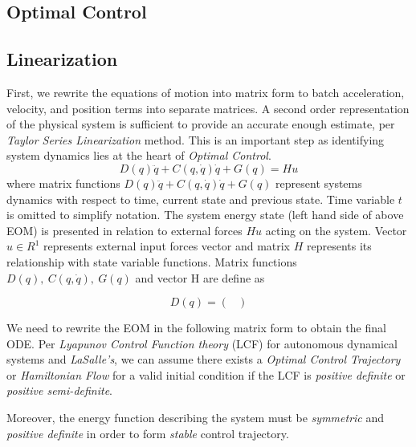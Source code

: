 \documentclass[journal]{IEEEtran}
\begin{document}
\subsection{Optimal Control}

\subsection{Linearization}
First, we rewrite the equations of motion into matrix form to batch acceleration,
velocity, and position terms into separate matrices. A second order representation
of the physical system is sufficient to provide an accurate enough estimate,
per \emph{Taylor Series Linearization} method. This is an important step as
identifying system dynamics lies at the heart of \emph{Optimal Control}.
\begin{equation}
D(q) \ddot{q} + C(q, \dot{q}) \dot{q} + G(q) = Hu
\end{equation}
where matrix functions \(D(q) \ddot{q} + C(q, \dot{q}) \dot{q} + G(q)\)
represent systems dynamics with respect to time,
current state and previous state. Time variable \(t\) is omitted to simplify
notation. The system energy state (left hand side of
above EOM) is presented in relation to external forces \(Hu\) acting on the
system. Vector \(u \in R^1\) represents external input forces vector and matrix
\(H\) represents its relationship with state variable functions. Matrix
functions \(D(q),~C(q, \dot{q}),~G(q)\) and vector H are define as

\begin{equation}
    D(q) = \begin{pmatrix}

    \end{pmatrix}
\end{equation}


We need to rewrite the EOM in the following
matrix form to obtain the final ODE. Per \emph{Lyapunov
Control Function theory} (LCF) for autonomous dynamical systems and
\emph{LaSalle's}, we can assume there exists a
\emph{Optimal Control Trajectory} or \emph{Hamiltonian Flow} for a valid
initial condition if the LCF is \emph{positive definite} or \emph{positive
semi-definite}.


Moreover, the energy function describing the system must be \emph{symmetric} and \emph{positive definite} in order to form \emph{stable} control trajectory.
\end{document}
